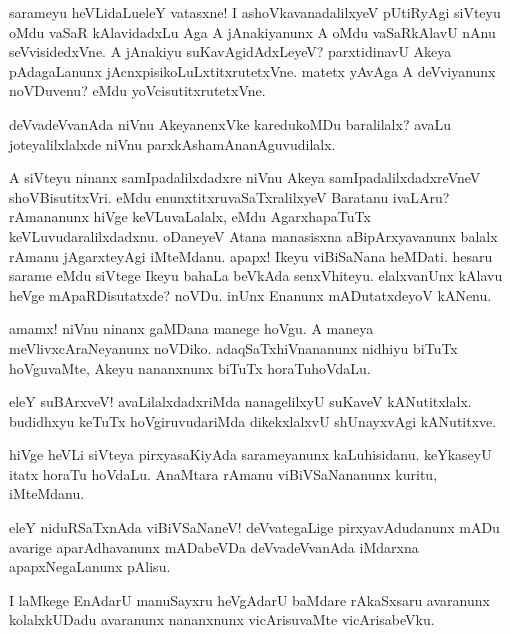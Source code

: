 \begin{mng}
sarameyu heVLidaLu\mdash eleY vatasxne! I ashoVkavanadalilxyeV pUtiRyAgi siVteyu oMdu vaSaR kAlavidadxLu Aga A jAnakiyanunx A oMdu vaSaRkAlavU nAnu seVvisidedxVne. A jAnakiyu suKavAgidAdxLeyeV? parxtidinavU Akeya pAdagaLanunx jAcnxpisikoLuLxtitxrutetxVne. matetx yAvAga A deVviyanunx noVDuvenu? eMdu yoVcisutitxrutetxVne.
\end{mng}

\begin{mng}
deVvadeVvanAda niVnu AkeyanenxVke karedukoMDu baralilalx? avaLu joteyalilxlalxde niVnu parxkAshamAnanAguvudilalx.
\end{mng}

\begin{mng}
A siVteyu ninanx samIpadalilxdadxre niVnu Akeya samIpadalilxdadxreVneV shoVBisutitxVri. eMdu enunxtitxruvaSaTxralilxyeV Baratanu ivaLAru? rAmananunx hiVge keVLuvaLalalx, eMdu AgarxhapaTuTx keVLuvudaralilxdadxnu. oDaneyeV Atana manasisxna aBipArxyavanunx balalx rAmanu jAgarxteyAgi iMteMdanu. apapx! Ikeyu viBiSaNana heMDati. hesaru sarame eMdu siVtege Ikeyu bahaLa beVkAda senxVhiteyu. elalxvanUnx kAlavu heVge mApaRDisutatxde? noVDu. inUnx Enanunx mADutatxdeyoV kANenu.
\end{mng}

\begin{mng}
amamx! niVnu ninanx gaMDana manege hoVgu. A maneya meVlivxcAraNeyanunx noVDiko. adaqSaTxhiVnananunx nidhiyu biTuTx hoVguvaMte, Akeyu nananxnunx biTuTx horaTuhoVdaLu.
\end{mng}

\begin{mng}
eleY suBArxveV! avaLilalxdadxriMda nanagelilxyU suKaveV kANutitxlalx. budidhxyu keTuTx hoVgiruvudariMda dikekxlalxvU shUnayxvAgi kANutitxve.
\end{mng}

\begin{mng}
hiVge heVLi siVteya pirxyasaKiyAda sarameyanunx kaLuhisidanu. keYkaseyU itatx horaTu hoVdaLu. AnaMtara rAmanu viBiVSaNananunx kuritu, iMteMdanu.
\end{mng}

\begin{mng}
eleY niduRSaTxnAda viBiVSaNaneV! deVvategaLige pirxyavAdudanunx mADu avarige aparAdhavanunx mADabeVDa deVvadeVvanAda iMdarxna apapxNegaLanunx pAlisu.
\end{mng}

\begin{mng}
I laMkege EnAdarU manuSayxru heVgAdarU baMdare rAkaSxsaru avaranunx kolalxkUDadu avaranunx nananxnunx vicArisuvaMte vicArisabeVku.
\end{mng}

